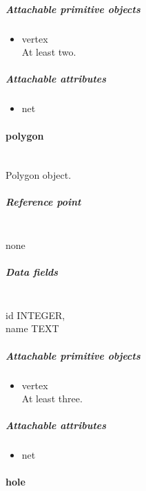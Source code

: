 \documentclass[12pt]{article}
\begin{document}
\subparagraph{Attachable primitive
objects}\label{attachable-primitive-objects-3}

\begin{itemize}
\itemsep1pt\parskip0pt
\item
  vertex\\At least two.
\end{itemize}

\subparagraph{Attachable attributes}\label{attachable-attributes-3}

\begin{itemize}
\itemsep1pt\parskip0pt
\item
  net
\end{itemize}

\paragraph{polygon}\label{polygon}

\mbox{}\\

Polygon object.

\subparagraph{Reference point}\label{reference-point-4}

\mbox{}\\

none

\subparagraph{Data fields}\label{data-fields-4}

\mbox{}\\

id INTEGER,\\
name TEXT

\subparagraph{Attachable primitive
objects}\label{attachable-primitive-objects-4}

\begin{itemize}
\item
  vertex\\
At least three.
\end{itemize}

\subparagraph{Attachable attributes}\label{attachable-attributes-4}

\begin{itemize}
\item
  net
\end{itemize}

\paragraph{hole}\label{hole}

\mbox{}\\
\end{document}
